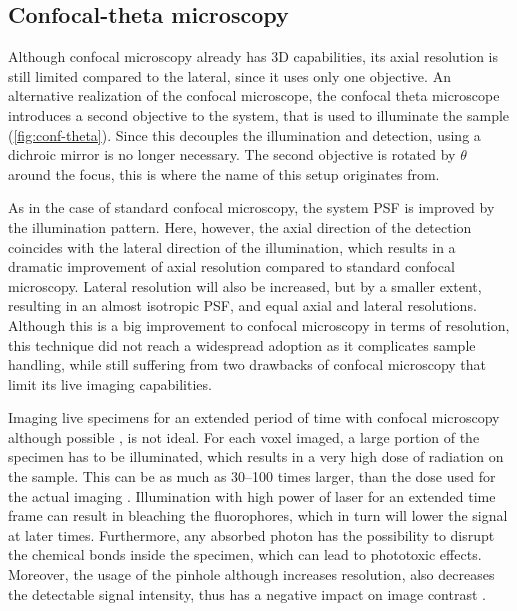   \subsection{Confocal-theta microscopy}

    Although confocal microscopy already has 3D capabilities, its axial resolution is still limited compared to the lateral, since it uses only one objective. An alternative realization of the confocal microscope, the confocal theta microscope \cite{stelzer_fundamental_1994} introduces a second objective to the system, that is used to illuminate the sample (\autoref{fig:conf-theta}). Since this decouples the illumination and detection, using a dichroic mirror is no longer necessary. The second objective is rotated by $\theta$ around the focus, this is where the name of this setup originates from.

    As in the case of standard confocal microscopy, the system PSF is improved by the illumination pattern. Here, however, the axial direction of the detection coincides with the lateral direction of the illumination, which results in a dramatic improvement of axial resolution compared to standard confocal microscopy. Lateral resolution will also be increased, but by a smaller extent, resulting in an almost isotropic PSF, and equal axial and lateral resolutions. %
    Although this is a big improvement to confocal microscopy in terms of resolution, this technique did not reach a widespread adoption as it complicates sample handling, while still suffering from two drawbacks of confocal microscopy that limit its live imaging capabilities.

    Imaging live specimens for an extended period of time with confocal microscopy although possible \cite{aldaz_live_2010, maitre_asymmetric_2016}, is not ideal. For each voxel imaged, a large portion of the specimen has to be illuminated, which results in a very high dose of radiation on the sample. This can be as much as 30--100 times larger, than the dose used for the actual imaging \cite{reynaud_light_2008}. Illumination with high power of laser for an extended time frame can result in bleaching the fluorophores, which in turn will lower the signal at later times. Furthermore, any absorbed photon has the possibility to disrupt the chemical bonds inside the specimen, which can lead to phototoxic effects. Moreover, the usage of the pinhole although increases resolution, also decreases the detectable signal intensity, thus has a negative impact on image contrast \cite{stelzer_contrast_1998}.

